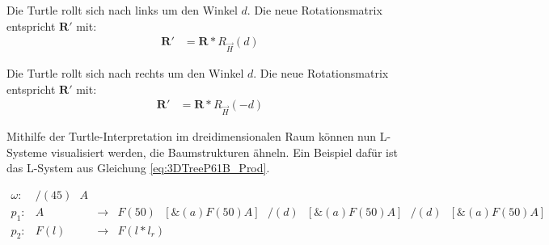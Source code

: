 \begin{description}[labelindent]
	\item[\boldmath$\backslash(d)$]  Die Turtle rollt sich nach links um den Winkel $d$. Die neue Rotationsmatrix entspricht $\boldsymbol{R'}$ mit:\\
	\begin{equation}
	\begin{array}{ll}
	\boldsymbol{R'} & =  \boldsymbol{R} * R_{\overrightarrow{H}}(d)
	\end{array}
	\end{equation}
	
	\item[\boldmath$/(d)$]  Die Turtle rollt sich nach rechts um den Winkel $d$. Die neue Rotationsmatrix entspricht $\boldsymbol{R'}$ mit:\\
	\begin{equation}
	\begin{array}{ll}
	\boldsymbol{R'} & =  \boldsymbol{R} * R_{\overrightarrow{H}}(-d)
	\end{array}
	\end{equation}
\end{description}
\cite[S.19]{ABOP:04} \cite[S.69]{Deussen:05}

Mithilfe der Turtle-Interpretation im dreidimensionalen Raum können nun L-Systeme visualisiert werden, die Baumstrukturen ähneln. Ein Beispiel dafür ist das L-System aus Gleichung \ref{eq:3DTreeP61B_Prod}.

\begin{equation}
	\begin{array}{llll}
	\omega :&  /(45)\text{ }A \\
	p_1 :&  A &\rightarrow & F(50)\text{ }[\&(a)F(50)A]\text{ }/(d)\text{ }[\&(a)F(50)A]\text{ }/(d)\text{ }[\&(a)F(50)A] \\
	p_2 :& F(l) &\rightarrow & F(l*l_r)
	\end{array}
	\label{eq:3DTreeP61B_Prod}
\end{equation}

